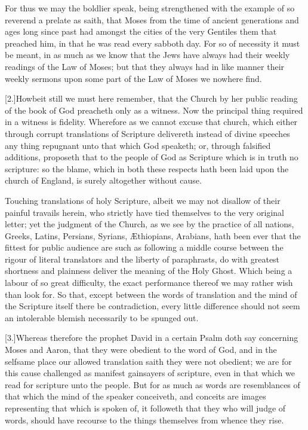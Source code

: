 For thus we may the boldlier speak, being strengthened with the example of so reverend a prelate as saith, that Moses from the time of ancient generations and ages long since past had amongst the cities of the very Gentiles them that preached him, in that he was read every sabboth day. For so of necessity it must be meant, in as much as we know that the Jews have always had their weekly readings of the Law of Moses; but that they always had in like manner their  weekly sermons upon some part of the Law of Moses we nowhere find.

[2.]Howbeit still we must here remember, that the Church by her public reading of the book of God preacheth only as a witness. Now the principal thing required in a witness is fidelity. Wherefore as we cannot excuse that church, which either through corrupt translations of Scripture delivereth instead of divine speeches any thing repugnant unto that which God speaketh; or, through falsified additions, proposeth that to the people of God as Scripture which is in truth no scripture: so the blame, which in both these respects hath been laid upon the church of England, is surely altogether without cause.

Touching translations of holy Scripture, albeit we may not disallow of their painful travails herein, who strictly have tied themselves to the very original letter; yet the judgment of the Church, as we see by the practice of all nations, Greeks, Latins, Persians, Syrians, Æthiopians, Arabians, hath been ever that the fittest for public audience are such as following a middle course between the rigour of literal translators and the liberty of paraphrasts, do with greatest shortness and plainness deliver the meaning of the Holy Ghost. Which being a labour of so great difficulty, the exact performance thereof we may rather wish than look for. So that, except between the words of translation and the mind of the Scripture itself there be contradiction, every little difference should not seem an intolerable blemish necessarily to be spunged out.

[3.]Whereas therefore the prophet David in a certain  Psalm doth say concerning Moses and Aaron,
 that they were obedient to the word of God, and in the selfsame place our allowed translation saith they were not obedient; we are for this cause challenged as manifest gainsayers of scripture, even in that which we read for scripture unto the people. But for as much as words are resemblances of that which the mind of the speaker conceiveth, and conceits are images representing that which is spoken of, it followeth that they who will judge of words, should have recourse to the things themselves from whence they rise.



